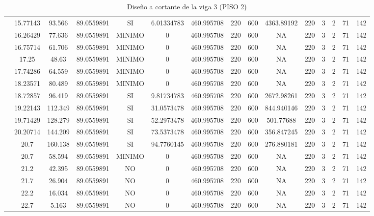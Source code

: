 \begin{table}[H]
{\begin{tabular}{|c|c|c|c|c|c|c|c|c|c|c|c|c|c|c|}
\cline{2-15}    & 15.77143 & 93.566 & 89.0559891 & SI  & 6.01334783 & 460.995708 & 220 & 600 & 4363.89192 & 220 & 3   & 2   & 71  & 142 \bigstrut\\
\cline{2-15}    & 16.26429 & 77.636 & 89.0559891 & MINIMO & 0   & 460.995708 & 220 & 600 & NA  & 220 & 3   & 2   & 71  & 142 \bigstrut\\
\cline{2-15}    & 16.75714 & 61.706 & 89.0559891 & MINIMO & 0   & 460.995708 & 220 & 600 & NA  & 220 & 3   & 2   & 71  & 142 \bigstrut\\
\cline{2-15}    & 17.25 & 48.63 & 89.0559891 & MINIMO & 0   & 460.995708 & 220 & 600 & NA  & 220 & 3   & 2   & 71  & 142 \bigstrut\\
\cline{2-15}    & 17.74286 & 64.559 & 89.0559891 & MINIMO & 0   & 460.995708 & 220 & 600 & NA  & 220 & 3   & 2   & 71  & 142 \bigstrut\\
\cline{2-15}    & 18.23571 & 80.489 & 89.0559891 & MINIMO & 0   & 460.995708 & 220 & 600 & NA  & 220 & 3   & 2   & 71  & 142 \bigstrut\\
\cline{2-15}    & 18.72857 & 96.419 & 89.0559891 & SI  & 9.81734783 & 460.995708 & 220 & 600 & 2672.98261 & 220 & 3   & 2   & 71  & 142 \bigstrut\\
\cline{2-15}    & 19.22143 & 112.349 & 89.0559891 & SI  & 31.0573478 & 460.995708 & 220 & 600 & 844.940146 & 220 & 3   & 2   & 71  & 142 \bigstrut\\
\cline{2-15}    & 19.71429 & 128.279 & 89.0559891 & SI  & 52.2973478 & 460.995708 & 220 & 600 & 501.77688 & 220 & 3   & 2   & 71  & 142 \bigstrut\\
\cline{2-15}    & 20.20714 & 144.209 & 89.0559891 & SI  & 73.5373478 & 460.995708 & 220 & 600 & 356.847245 & 220 & 3   & 2   & 71  & 142 \bigstrut\\
\cline{2-15}    & 20.7 & 160.138 & 89.0559891 & SI  & 94.7760145 & 460.995708 & 220 & 600 & 276.880181 & 220 & 3   & 2   & 71  & 142 \bigstrut\\
\cline{2-15}    & 20.7 & 58.594 & 89.0559891 & MINIMO & 0   & 460.995708 & 220 & 600 & NA  & 220 & 3   & 2   & 71  & 142 \bigstrut\\
\cline{2-15}    & 21.2 & 42.395 & 89.0559891 & NO  & 0   & 460.995708 & 220 & 600 & NA  & 220 & 3   & 2   & 71  & 142 \bigstrut\\
\cline{2-15}    & 21.7 & 26.904 & 89.0559891 & NO  & 0   & 460.995708 & 220 & 600 & NA  & 220 & 3   & 2   & 71  & 142 \bigstrut\\
\cline{2-15}    & 22.2 & 16.034 & 89.0559891 & NO  & 0   & 460.995708 & 220 & 600 & NA  & 220 & 3   & 2   & 71  & 142 \bigstrut\\
\cline{2-15}    & 22.7 & 5.163 & 89.0559891 & NO  & 0   & 460.995708 & 220 & 600 & NA  & 220 & 3   & 2   & 71  & 142 \bigstrut\\
\hline
\end{tabular}%

  


  }%
    \caption{Diseño a cortante de la viga 3 (PISO 2) }
  \label{tab:C VG3 P2 }%
\end{table}%
